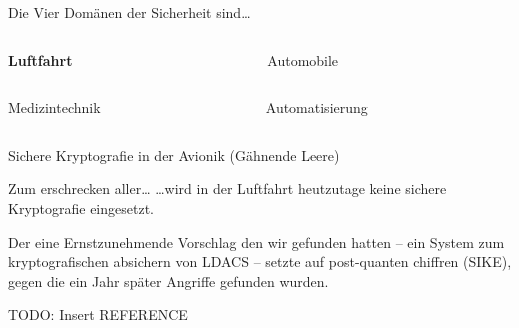 
\begin{frame}{Die Vier Domänen der Sicherheit sind…}
  \begin{columns}[c]
    \begin{column}{.5\linewidth}
      \textbf{Luftfahrt}
    \end{column}
    \begin{column}{.5\linewidth}
      Automobile
    \end{column}
  \end{columns}
  \vfill
  \begin{columns}[c]
    \begin{column}{.5\linewidth}
      Medizintechnik
    \end{column}
    \begin{column}{.5\linewidth}
      Automatisierung
    \end{column}
  \end{columns}
\end{frame}


\begin{frame}[c]{Sichere Kryptografie in der Avionik}
  \vspace{4em}
  \footnotesize
  (Gähnende Leere)
\end{frame}

\begin{frame}[c]{Zum erschrecken aller…}
  \vspace{10em}
  \footnotesize
  …wird in der Luftfahrt heutzutage keine sichere Kryptografie eingesetzt. 

  \vspace{1em}
  Der eine Ernstzunehmende Vorschlag den wir gefunden hatten -- ein System zum kryptografischen absichern von LDACS --
  setzte auf post-quanten chiffren (SIKE), gegen die ein Jahr später Angriffe gefunden wurden.

  \vspace{1em}
  TODO: Insert REFERENCE
\end{frame}

